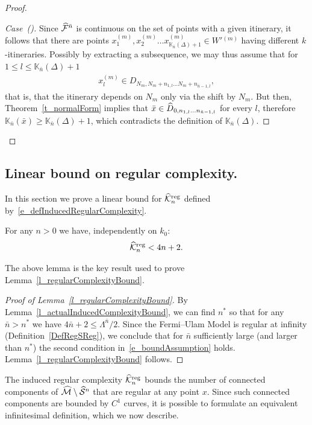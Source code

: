\documentclass[AHL, Unicode, longabstracts,published]{cedram}
\newcommand{\LC}{\mathbb{K}}
\newcommand{\cm}{\mathcal{F}}
\newcommand{\csp}{\mathcal{M}}
\newcommand{\cmp}{\hat\cm}
\newcommand{\cspi}{\widehat{\csp}}
\newcommand{\brx}{\bar{x}}
\newcommand{\singPrivate}{\mathcal{S}}
\newcommand{\singp}[1]{\hat{\singPrivate}^{#1}}
\newcommand{\xseq}[1]{\privSeq x{#1}}
\newcommand{\ckregp}{\hat{\mathcal{K}}^\text{reg}}
\newcommand{\privSeq}[2]{#1^{(#2)}}
\newcommand{\Wpseq}[1]{\privSeq{W'{}}{#1}}
\newcommand{\hDom}{\hat D}
\newcounter{casecount}
\renewcommand*\thecasecount{(\alph{casecount})}
\newenvironment{case}{\refstepcounter{casecount}\begin{proof}[{Case~\thecasecount}]}{\let\qed\relax\end{proof}}
\let\oldhat\hat
\renewcommand*{\hat}[1]{\mathchoice{\widehat{#1}}{\widehat{#1}}{\oldhat{#1}}{\oldhat{#1}}}
\begin{document}
\begin{proof}
\begin{case}
Since $\cmp^{\bar n}$ is continuous on the set of points with a given itinerary, it follows that there are points $\xseq{m}_1, \xseq{m}_2\dots \xseq{m}_{\LC_{\bar n}(\Delta)+1}\in
\Wpseq{m}$ having different $k$-itineraries. Possibly by extracting a subsequence, we may thus assume that for $1\le l\le\LC_{\bar n}(\Delta)+1$
\begin{align*}
\xseq{m}_{l}\in D_{N_m, N_m+n_{1,l}\dots N_m+n_{\bar n-1,l}},
\end{align*}
that is, that the itinerary depends on $N_m$ only via the shift by $N_m$. But then, Theorem~\ref{t_normalForm} implies that $\brx\in \hDom_{0, n_{1,l}\dots n_{\bar n-1,l}}$ for every $l$, therefore $\LC_{\bar n}(\brx)\geq \LC_{\bar n}(\Delta)+1$, which contradicts the definition of $\LC_{\bar n}(\Delta)$.\qedhere
\end{case}\let\qed\relax
\end{proof}



\subsection{Linear bound on regular complexity.}\label{SSPointwise}

In this section we prove a linear bound for $\ckregp_n$ defined by~\eqref{e_defInducedRegularComplexity}.

\begin{lemm}\label{l_actualInducedComplexityBound}
For any $n > 0$ we have, independently on $k_{0}$:
\begin{align}\label{e_actualInducedComplexityBound}
\ckregp_n < 4n + 2.
\end{align}
\end{lemm} 

The above lemma is the key result used to prove Lemma~\ref{l_regularComplexityBound}.

\begin{proof}[Proof of Lemma~\ref{l_regularComplexityBound}]
By Lemma~\ref{l_actualInducedComplexityBound}, we can find $n^{*}$ so that for any $\bar n > n^*$ we have $4\bar n+2\leq \Lambda^{\bar n}/2$. Since the Fermi--Ulam Model is regular at infinity (Definition~\ref{DefRegSReg}), we conclude that for $\bar n$ sufficiently large (and larger than $n^{*}$) the second condition in~\eqref{e_boundAssumption} holds. Lemma~\ref{l_regularComplexityBound} follows.
\end{proof}

The induced regular complexity $\ckregp_n$ bounds the number of connected components of $\cspi\setminus\singp{n}$ that are regular at any point $x$. Since such connected components are bounded by $C^{1}$ curves, it is possible to formulate an equivalent infinitesimal definition, which we now describe.
\end{document}
